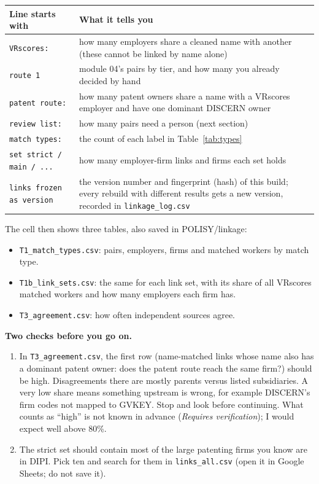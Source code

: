 \documentclass[11pt,a4paper]{article}
\newcommand{\RV}{\textcolor{rvtext}{\textit{Requires verification}}}
\newcommand{\file}[1]{\texttt{#1}}
\begin{document}
\begin{longtable}{@{}L{4.4cm}L{10.6cm}@{}}
\toprule
\textbf{Line starts with} & \textbf{What it tells you}\\
\midrule\endhead
\bottomrule\endfoot
\texttt{VRscores:} & how many employers share a cleaned name with another (these cannot be linked by name alone)\\
\texttt{route 1} & module 04's pairs by tier, and how many you already decided by hand\\
\texttt{patent route:} & how many patent owners share a name with a VRscores employer and have one dominant DISCERN owner\\
\texttt{review list:} & how many pairs need a person (next section)\\
\texttt{match types:} & the count of each label in Table~\ref{tab:types}\\
\texttt{set strict / main / ...} & how many employer-firm links and firms each set holds\\
\texttt{links frozen as version} & the version number and fingerprint (hash) of this build; every rebuild with different results gets a new version, recorded in \file{linkage\_log.csv}\\
\end{longtable}

The cell then shows three tables, also saved in POLISY/linkage:
\begin{itemize}\setlength{\itemsep}{2pt}
\item \file{T1\_match\_types.csv}: pairs, employers, firms and matched workers by match type.
\item \file{T1b\_link\_sets.csv}: the same for each link set, with its share of all VRscores matched workers and how many employers each firm has.
\item \file{T3\_agreement.csv}: how often independent sources agree.
\end{itemize}

\textbf{Two checks before you go on.}
\begin{enumerate}\setlength{\itemsep}{2pt}
\item In \file{T3\_agreement.csv}, the first row (name-matched links whose name also has a dominant patent owner: does the patent route reach the same firm?) should be high. Disagreements there are mostly parents versus listed subsidiaries. A very low share means something upstream is wrong, for example DISCERN's firm codes not mapped to GVKEY. Stop and look before continuing. What counts as ``high'' is not known in advance (\RV); I would expect well above 80\%.
\item The strict set should contain most of the large patenting firms you know are in DIPI. Pick ten and search for them in \file{links\_all.csv} (open it in Google Sheets; do not save it).
\end{enumerate}
\end{document}

